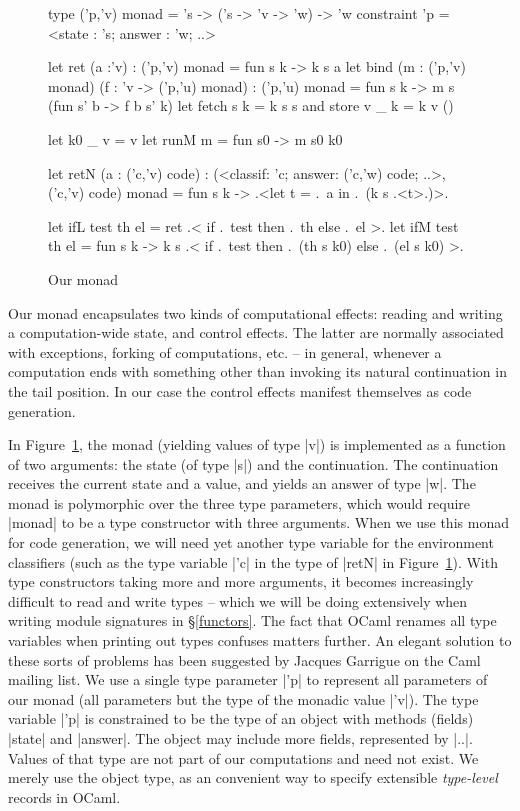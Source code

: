 \documentclass{elsart}
\begin{document}
\begin{figure}
\begin{code}
type ('p,'v) monad = 's -> ('s -> 'v -> 'w) -> 'w
    constraint 'p = <state : 's; answer : 'w; ..>

let ret (a :'v) : ('p,'v) monad = fun s k -> k s a
let bind (m : ('p,'v) monad) (f : 'v -> ('p,'u) monad) : ('p,'u) monad
  = fun s k -> m s (fun s' b -> f b s' k)
let fetch s k = k s s  and  store v _ k = k v ()

let k0 _ v = v
let runM m = fun s0 -> m s0 k0 

let retN (a : ('c,'v) code) : 
 (<classif: 'c; answer: ('c,'w) code; ..>,('c,'v) code) monad 
   = fun s k -> .<let t = .~a in .~(k s .<t>.)>.

let ifL test th el = ret .< if .~test then .~th else .~el >.
let ifM test th el = fun s k -> 
  k s .< if .~test then .~(th s k0) else .~(el s k0) >.
\end{code}
\caption{Our monad}\label{ourmonad}
\end{figure}

Our monad encapsulates two kinds of computational effects: reading and
writing a computation-wide state, and control effects. The latter are
normally associated with exceptions, forking of computations, etc. --
in general, whenever a computation ends with something other than
invoking its natural continuation in the tail position. In our case
the control effects manifest themselves as code generation.

In Figure~\ref{ourmonad}, the monad (yielding values of type |v|)
is implemented as a function of two
arguments: the state (of type |s|) and the continuation. The
continuation receives the current state and a value, and
yields an answer of type |w|.  The monad is polymorphic over the
three type parameters, which would require |monad| to be a type
constructor with three arguments. When we use this monad for code
generation, we will need yet another type variable for the environment
classifiers \cite{taha-environment} (such as the type variable |'c| 
in the type of |retN| in Figure~\ref{ourmonad}).
With type constructors taking more
and more arguments, it becomes increasingly difficult to read and write
types -- which we will be doing extensively when writing module
signatures in \S\ref{functors}. The fact that OCaml renames all type
variables when printing out types confuses matters further. An elegant
solution to these sorts of problems has been suggested by 
Jacques Garrigue on the Caml mailing list.
%
We use a single type parameter |'p| to
represent all parameters of our monad (all parameters but the type of
the monadic value |'v|). The type variable |'p| is constrained to be
the type of an object with methods (fields) |state| and |answer|. The
object may include more fields, represented by |..|. Values of that
type are not part of our computations and need not exist. We merely
use the object type, as an convenient way to specify extensible
\emph{type-level} records in OCaml.     
\end{document}
